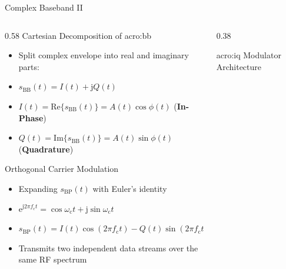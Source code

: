 \begin{frame}{Complex Baseband II}
  \begin{columns}[T,onlytextwidth]
    \begin{column}{0.58\textwidth}
      Cartesian Decomposition of \gls{acro:bb}\\
      \begin{itemize}
        \item Split complex envelope into real and imaginary parts:
        \item $s_\text{BB}(t) = I(t) + \mathrm{j} Q(t)$
        \item $I(t) = \mathrm{Re}\{s_\mathrm{BB}(t)\} = A(t)\cos\phi(t)$ (\textbf{In-Phase})
        \item $Q(t) = \mathrm{Im}\{s_\mathrm{BB}(t)\} = A(t)\sin\phi(t)$ (\textbf{Quadrature})
      \end{itemize}
      \vspace{0.8em}
      Orthogonal Carrier Modulation\\
      \begin{itemize}
        \item Expanding $s_\text{BP}(t)$ with Euler's identity
        \item $\mathrm{e}^{\mathrm{j} 2\pi f_\mathrm{c} t} = \cos \omega_\mathrm{c} t + \mathrm{j} \sin \omega_\mathrm{c} t$
        \item $s_\mathrm{BP}(t) = I(t)\cos(2\pi f_\mathrm{c} t) - Q(t)\sin(2\pi f_\mathrm{c} t)$
        \item Transmits two independent data streams over the same RF spectrum
      \end{itemize}
    \end{column}

    \begin{column}{0.38\textwidth}
      \begin{block}{\gls{acro:iq} Modulator Architecture}
        \centering
        
      \end{block}
    \end{column}
  \end{columns}
\end{frame}


